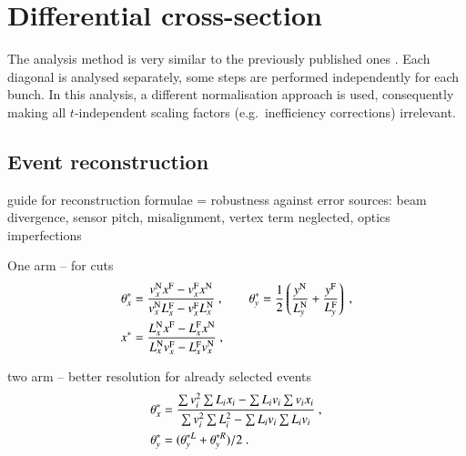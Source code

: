 \section{Differential cross-section}

The analysis method is very similar to the previously published ones \cite{prl111,epl101-el}. Each diagonal is analysed
separately, some steps are performed independently for each bunch. In this analysis, a different normalisation
approach is used, consequently making all $t$-independent scaling factors (e.g.~inefficiency corrections)
irrelevant.

\subsection{Event reconstruction}

guide for reconstruction formulae = robustness against error sources: beam divergence, sensor pitch, misalignment, vertex term neglected, optics imperfections

One arm -- for cuts
\begin{equation}
\label{eq:kin 1a}
	\begin{aligned}
		\theta_x^* &= {v_x^{\rm N} x^{\rm F} - v_x^{\rm F} x^{\rm N}\over v_x^{\rm N} L_x^{\rm F} - v_x^{\rm F} L_x^{\rm N}}\ ,\qquad
		\theta_y^* = {1\over 2} \left( {y^{\rm N}\over L_y^{\rm N}} + {y^{\rm F}\over L_y^{\rm F}} \right)\ ,\\
		x^* &= {L_x^{\rm N} x^{\rm F} - L_x^{\rm F} x^{\rm N}\over L_x^{\rm N} v_x^{\rm F} - L_x^{\rm F} v_x^{\rm N}}\ , \\
	\end{aligned}
\end{equation}

two arm -- better resolution for already selected events
\begin{equation}
\label{eq:kin 2a}
	\begin{aligned}
		\theta_x^* &= {
				\sum v_i^2 \sum L_i x_i - \sum L_i v_i \sum v_i x_i
				\over
				\sum v_i^2 \sum L_i^2 - \sum L_i v_i \sum L_i v_i
			}\ ,\\
		\theta_y^* &= (\theta_y^{*L} + \theta_y^{*R})/2\ .\\
	\end{aligned}
\end{equation}


